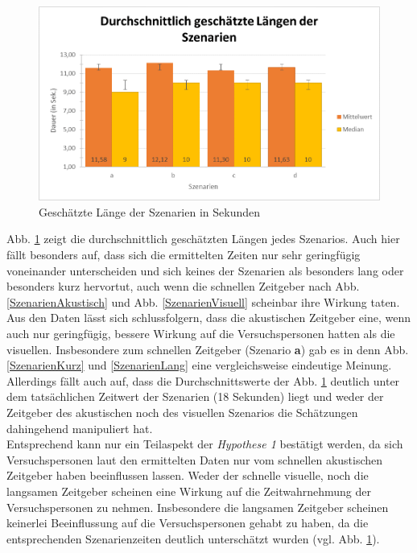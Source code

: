\documentclass{Paper}
\begin{document}
     \begin{figure}[H]
	\includegraphics[scale=0.7]{../Diagramme/einschaetzung/laenge_durchschnitt_alle.png}
	\caption{Geschätzte Länge der Szenarien in Sekunden}
	\label{LaengeSzenarien}
\end{figure}

Abb. \ref{LaengeSzenarien} zeigt die durchschnittlich geschätzten Längen jedes Szenarios. Auch hier fällt besonders auf, dass sich die ermittelten Zeiten nur sehr geringfügig voneinander unterscheiden und sich keines der Szenarien als besonders lang oder besonders kurz hervortut, auch wenn die schnellen Zeitgeber nach Abb. \ref{SzenarienAkustisch} und Abb. \ref{SzenarienVisuell} scheinbar ihre Wirkung taten.\\
Aus den Daten lässt sich schlussfolgern, dass die akustischen Zeitgeber eine, wenn auch nur geringfügig, bessere Wirkung auf die Versuchspersonen hatten als die visuellen. Insbesondere zum schnellen Zeitgeber (Szenario \textbf{a}) gab es in denn Abb. \ref{SzenarienKurz} und \ref{SzenarienLang} eine vergleichsweise eindeutige Meinung. Allerdings fällt auch auf, dass die Durchschnittswerte der Abb. \ref{LaengeSzenarien} deutlich unter dem tatsächlichen Zeitwert der Szenarien (18 Sekunden) liegt und weder der Zeitgeber des akustischen noch des visuellen Szenarios die Schätzungen dahingehend manipuliert hat. \\
Entsprechend kann nur ein Teilaspekt der \textit{Hypothese 1} bestätigt werden, da sich Versuchspersonen laut den ermittelten Daten nur vom schnellen akustischen Zeitgeber haben beeinflussen lassen. Weder der schnelle visuelle, noch die langsamen Zeitgeber scheinen eine Wirkung auf die Zeitwahrnehmung der Versuchspersonen zu nehmen. Insbesondere die langsamen Zeitgeber scheinen keinerlei Beeinflussung auf die Versuchspersonen gehabt zu haben, da die entsprechenden Szenarienzeiten deutlich unterschätzt wurden (vgl. Abb. \ref{LaengeSzenarien}).
      
\end{document}
